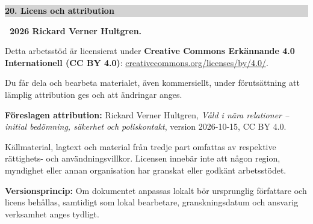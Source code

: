 \documentclass[10pt,a4paper]{article}
\newenvironment{alertbox}[1]{%
  \def\boxtitle{#1}%
  \begin{lrbox}{\legacybox}%
  \begin{minipage}{0.955\linewidth}%
  \ifx\boxtitle\empty\else\textbf{#1}\par\smallskip\fi
}{%
  \end{minipage}%
  \end{lrbox}%
  \par\smallskip\noindent
  \fcolorbox{black}{lightgray}{\usebox{\legacybox}}%
  \par\smallskip
}
\newcommand{\sectionbar}[1]{%
  \par\smallskip\noindent
  \colorbox{lightgray}{\parbox{0.965\linewidth}{\bfseries #1}}%
  \par\smallskip
}
\begin{document}
\sectionbar{20. Licens och attribution}

\textbf{\textcopyright\ 2026 Rickard Verner Hultgren.}

Detta arbetsstöd är licensierat under \textbf{Creative Commons Erkännande 4.0 Internationell (CC BY 4.0)}:
\href{https://creativecommons.org/licenses/by/4.0/deed.sv}{creativecommons.org/licenses/by/4.0/}.

Du får dela och bearbeta materialet, även kommersiellt, under förutsättning att lämplig attribution ges och att ändringar anges.

\textbf{Föreslagen attribution:} Rickard Verner Hultgren, \emph{Våld i nära relationer -- initial bedömning, säkerhet och poliskontakt}, version 2026-10-15, CC BY 4.0.

Källmaterial, lagtext och material från tredje part omfattas av respektive rättighets- och användningsvillkor. Licensen innebär inte att någon region, myndighet eller annan organisation har granskat eller godkänt arbetsstödet.

\begin{alertbox}{}
\textbf{Versionsprincip:} Om dokumentet anpassas lokalt bör ursprunglig författare och licens behållas, samtidigt som lokal bearbetare, granskningsdatum och ansvarig verksamhet anges tydligt.
\end{alertbox}
\end{document}
